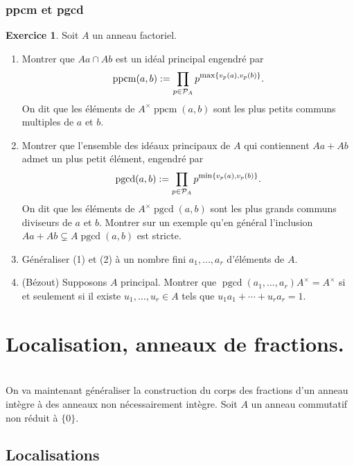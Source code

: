 \documentclass[a4paper, oneside, 12pt]{book}
\theoremstyle{theoremeStyle} %
\theoremstyle{definition} %
\newtheorem{exercice}[theoreme]{Exercice}
\DeclareMathOperator{\pgcd}{pgcd}
\DeclareMathOperator{\ppcm}{ppcm}
\begin{document}
\subsection{ppcm et pgcd}
\begin{exercice}
  Soit $A$ un anneau factoriel.
  \begin{enumerate}
  \item Montrer que $Aa\cap Ab$ est un idéal principal engendré par
    $$\ppcm(a, b):=\prod_{p\in\mathcal{P}_A}p^{\hbox{\rm \footnotesize max}\{v_p(a),v_p(b)\}}.$$
    On dit que les éléments de $A^\times \ppcm(a, b) $ sont les plus petits communs multiples de $a$ et $b$.
  \item Montrer que l'ensemble des idéaux principaux de $A$ qui contiennent $Aa+ Ab$ admet un plus petit élément, engendré par
    $$\pgcd(a, b):=\prod_{p\in\mathcal{P}_A}p^{\hbox{\rm \footnotesize min}\{ v_p(a),v_p(b)\}}.$$
    On dit que les éléments de $A^\times \pgcd(a, b) $ sont les plus grands communs diviseurs de $a$ et $b$. Montrer sur un exemple qu'en général l'inclusion $Aa+Ab\subsetneq A\pgcd(a,b)$ est stricte.
  \item Généraliser  (1) et (2) à un nombre fini $a_1,\dotsc, a_r$ d'éléments de $A$.
  \item (Bézout) Supposons $A$ principal. Montrer que $\pgcd(a_1,\dotsc, a_r)A^\times= A^\times$ si et seulement si il existe $u_1,\dotsc, u_r\in A$ tels que $u_1a_1+\dotsb+u_ra_r=1$.
  \end{enumerate}
\end{exercice}





\chapter{Localisation, anneaux de fractions.}\textit{}\\
 On va maintenant généraliser la construction du corps des fractions d'un anneau intègre à des anneaux non nécessairement intègre. Soit $A$ un anneau commutatif non réduit à $\{0\}$.

\section{Localisations}
\end{document}
